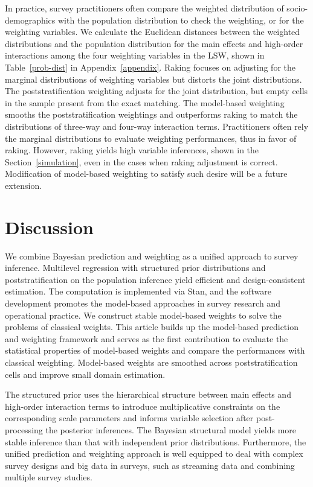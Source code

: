 \documentclass[11pt]{article}
\begin{document}
In practice, survey practitioners often compare the weighted distribution of socio-demographics with the population distribution to check the weighting, or for the weighting variables. We calculate the Euclidean distances between the weighted distributions and the population distribution for the main effects and high-order interactions among the four weighting variables in the LSW, shown in Table~\ref{prob-dist} in Appendix~\ref{appendix}. Raking focuses on adjusting for the marginal distributions of weighting variables but distorts the joint distributions. The poststratification weighting adjusts for the joint distribution, but empty cells in the sample present from the exact matching. The model-based weighting smooths the poststratification weightings and outperforms raking to match the distributions of three-way and four-way interaction terms. Practitioners often rely the marginal distributions to evaluate weighting performances, thus in favor of raking. However, raking yields high variable inferences, shown in the Section~\ref{simulation}, even in the cases when raking adjustment is correct. 
Modification of model-based weighting to satisfy such desire will be a future extension.

\section{Discussion}
\label{discussion}

We combine Bayesian prediction and weighting as a unified approach to survey inference. Multilevel regression with structured prior distributions and poststratification on the population inference yield efficient and design-consistent estimation. The computation is implemented via Stan, and the software development promotes the model-based approaches in survey research and operational practice. We construct stable model-based weights to solve the problems of classical weights. This article builds up the model-based prediction and weighting framework and serves as the first contribution to evaluate the statistical properties of model-based weights and compare the performances with classical weighting. Model-based weights are smoothed across poststratification cells and improve small domain estimation. 

The structured prior uses the hierarchical structure between main effects and high-order interaction terms to introduce multiplicative constraints on the corresponding scale parameters and informs variable selection after post-processing the posterior inferences. The Bayesian structural model yields more stable inference than that with independent prior distributions. Furthermore, the unified prediction and weighting approach is well equipped to deal with complex survey designs and big data in surveys, such as streaming data and combining multiple survey studies. 
\end{document}

